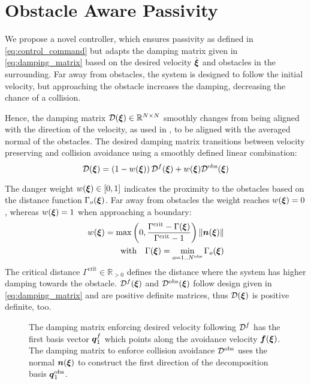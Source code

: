 \section{Obstacle Aware Passivity} \label{sec:obstacle_aware_passivity}
We propose a novel controller, which ensures passivity as defined in \eqref{eq:control_command} but adapts the damping matrix given in \eqref{eq:damping_matrix} based on the desired velocity $\dot{\boldsymbol{\xi}}$ and obstacles in the surrounding. 
Far away from obstacles, the system is designed to follow the initial velocity, but approaching the obstacle increases the damping, decreasing the chance of a collision.

Hence, the damping matrix $\mathcal{D}(\boldsymbol{\xi}) \in \mathbb{R}^{N \times N}$ smoothly changes from being aligned with the direction of the velocity, as used in \cite{kronander2015passive}, to be aligned with the averaged normal of the obstacles. The desired damping matrix transitions between velocity preserving and collision avoidance using a smoothly defined linear combination:
\begin{equation}
    \matd D(\vecs\xi) = \left(1 - w(\vecs\xi) \right) {\matd D^{f}}(\vecs\xi) + w(\vecs\xi)  {\matd D^{\mathrm{obs}}}(\vecs\xi) \label{eq:damping_summation}
\end{equation}

The danger weight $w(\boldsymbol{\xi}) \in [0, 1]$ indicates the proximity to the obstacles based on the distance function $\Gamma_o(\boldsymbol{\xi})$. Far away from obstacles the weight reaches $w(\boldsymbol{\xi}) = 0$, whereas $w(\boldsymbol{\xi}) = 1$ when approaching a boundary:
\begin{equation}
  \begin{split}
w(\vecs\xi) =
\max \left(0,  \frac{\Gamma^{\mathrm{crit}} - \Gamma(\vecs\xi)}{\Gamma^{\mathrm{crit}} - 1} \right) \| \vecs n(\vecs \xi) \| \\
\text{with} \quad
\Gamma(\vecs\xi) = \min_{o = 1..N^{\mathrm{obs}}} \Gamma_o(\vecs\xi)
\label{eq:weight_function}
\end{split}
\end{equation}
The critical distance $\Gamma^{\mathrm{crit}} \in \mathbb{R}_{>0}$ defines the distance where the system has higher damping towards the obstacle.
${\mathcal{D}^f}(\boldsymbol{\xi})$ and $\mathcal{D^{\mathrm{obs}}}(\boldsymbol{\xi})$ follow design given in \eqref{eq:damping_matrix} and are positive definite matrices, thus $\mathcal{D}(\boldsymbol{\xi})$ is positive definite, too.

\begin{figure}
  \center
  
\caption{The damping matrix enforcing desired velocity following $\mathcal{D}^{f}$ has the first basis vector $\boldsymbol{q}_1^{f}$ which points along the avoidance velocity $\boldsymbol{f}(\boldsymbol{\xi})$. The damping matrix to enforce collision avoidance $\mathcal{D}^{\mathrm{obs}}$ uses the normal $\boldsymbol{n}(\boldsymbol{\xi})$ to construct the first direction of the decomposition basis $\boldsymbol{q}^{\mathrm{obs}}_1$.}
\label{fig:damping_basis_construction}
\end{figure}

